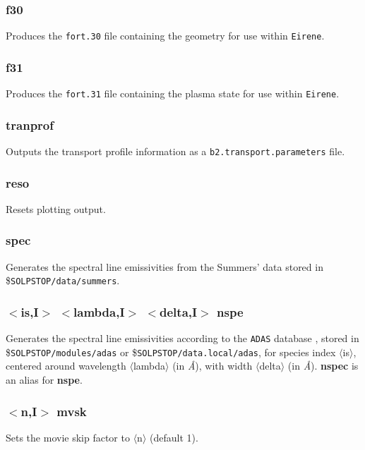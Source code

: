 \documentclass[a4paper,10pt]{report}
\begin{document}
\subsubsection{f30}\label{sec:f30}
Produces the \verb:fort.30: file containing the geometry for use within {\tt Eirene}.

\subsubsection{f31}\label{sec:f31}
Produces the \verb:fort.31: file containing the plasma state for use within {\tt Eirene}.

\subsubsection{tranprof}\label{sec:tranprof}
Outputs the transport profile information as a \verb:b2.transport.parameters: file.

\subsubsection{reso}\label{sec:reso}
Resets plotting output.

\subsubsection{spec}\label{sec:spec}
Generates the spectral line emissivities from the Summers' data stored
in \${\tt SOLPSTOP/data/summers}.

\subsubsection{$<$is,{\bf I}$>$ $<$lambda,{\bf I}$>$ $<$delta,{\bf I}$>$ nspe}\label{sec:nspe}
Generates the spectral line emissivities according to the {\tt ADAS} database \cite{ADAS}, stored in \${\tt SOLPSTOP/modules/adas}
or \${\tt SOLPSTOP/data.local/adas}, for species index $\langle$is$\rangle$, centered around wavelength $\langle$lambda$\rangle$ (in {\em \AA}),
with width $\langle$delta$\rangle$ (in {\em \AA}).
{\bf nspec} is an alias for {\bf nspe}.

\subsubsection{$<$n,{\bf I}$>$ mvsk}\label{sec:mvsk}
Sets the movie skip factor to $\langle$n$\rangle$ (default 1).
\end{document}
